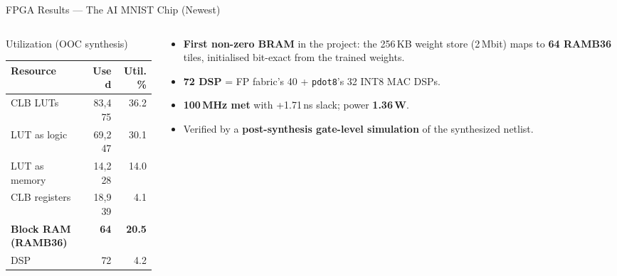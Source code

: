 \documentclass[aspectratio=169,11pt]{beamer}
\newcommand{\hl}[1]{{\color{simtixaccent}\textbf{#1}}}
\newcommand{\navy}[1]{{\color{simtixblue}\textbf{#1}}}
\begin{document}
\begin{frame}{FPGA Results --- The AI MNIST Chip (Newest)}
  \begin{columns}[T]
    \begin{column}{0.52\textwidth}
      \begin{block}{Utilization (OOC synthesis)}
        \small
        \begin{tabular}{@{}lrr@{}}
          \toprule
          Resource & Used & Util.\ \% \\
          \midrule
          CLB LUTs           & 83{,}475 & 36.2 \\
          \; LUT as logic    & 69{,}247 & 30.1 \\
          \; LUT as memory   & 14{,}228 & 14.0 \\
          CLB registers      & 18{,}939 & 4.1 \\
          \textbf{Block RAM (RAMB36)} & \textbf{64} & \textbf{20.5} \\
          DSP                & 72 & 4.2 \\
          \bottomrule
        \end{tabular}
      \end{block}
    \end{column}
    \begin{column}{0.48\textwidth}
      \begin{itemize}
        \item \hl{First non-zero BRAM} in the project: the 256\,KB weight store (2\,Mbit) maps to
          \navy{64 RAMB36} tiles, initialised bit-exact from the trained weights.
        \item \navy{72 DSP} = FP fabric's 40 + \texttt{pdot8}'s 32 INT8 MAC DSPs.
        \item \navy{100\,MHz met} with +1.71\,ns slack; power \textbf{1.36\,W}.
        \item Verified by a \hl{post-synthesis gate-level simulation} of the synthesized netlist.
      \end{itemize}
    \end{column}
  \end{columns}
\end{frame}
\end{document}
